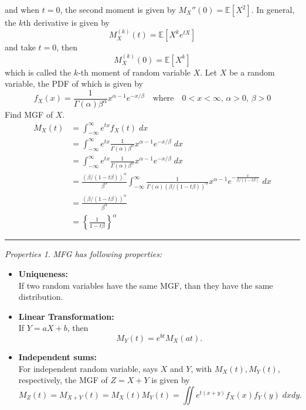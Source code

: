 \documentclass[twoside]{article}
\makeatletter
\theoremstyle{definition}
\theoremstyle{remark}
\newtheorem{properties}[theorem]{Properties}
\theoremstyle{remark}
\newenvironment{example}
 {\patchcmd{\@thm}{\trivlist}{\list{}{\leftmargin=3em \rightmargin=3em}}{}{}%
  \vspace*{10\p@}
  \innerexample\pushQED{\hfill\ensuremath{\Diamond}}}
 {\popQED\endinnerexample}
\newenvironment{sol}{{\bf Solution:}}{\hfill\rule{2mm}{2mm}}
\makeatother
\begin{document}
and when $t=0$, the second moment is given by $M_X''(0) = \mathbb{E}[X^2]$. In
general, the $k$th derivative is given by
\begin{equation}
  M_X^{(k)}(t) = \mathbb{E}[X^k{e^{tX}}]
\end{equation}
and take $t=0$, then
\begin{equation}
  M_X^{(k)}(0) = \mathbb{E}[X^k]
\end{equation}
which is called the $k$-th moment of random variable $X$.
\begin{example}
  Let $X$ be a random variable, the PDF of which is given by
  \begin{equation*}
    f_X(x) = \frac{1}{\Gamma(\alpha)\beta^{\alpha}} x^{\alpha-1}e^{-x/\beta}
    \quad \textrm{where} \quad 0 < x < \infty,\, \alpha>0,\, \beta>0
  \end{equation*}
  Find MGF of $X$. \\
  \begin{sol}
    \begin{equation*}
      \begin{split}
        M_X(t)
        &= \int_{-\infty}^{\infty} e^{tx} f_X(t) \;dx \\
        &= \int_{-\infty}^{\infty} e^{tx} \frac{1}{\Gamma(\alpha)\beta^{\alpha}} x^{\alpha-1}e^{-x/\beta} \;dx \\
        &= \int_{-\infty}^{\infty} e^{tx} \frac{1}{\Gamma(\alpha)\beta^{\alpha}} x^{\alpha-1}e^{-x/\beta} \;dx \\
        &= \frac{{(\beta/(1-t\beta))}^\alpha}{\beta^{\alpha}} \int_{-\infty}^{\infty} \frac{1}{\Gamma(\alpha){(\beta/(1-t\beta))}^\alpha} x^{\alpha-1} e^{-\frac{x}{\beta/(1-t\beta)}}  \;dx \\
        &= \frac{{(\beta/(1-t\beta))}^\alpha}{\beta^\alpha} \\
        &= {\left\{\frac{1}{1-t\beta}\right\}}^\alpha
      \end{split}
    \end{equation*}
  \end{sol}
\end{example}

\begin{properties}{\it MFG has following properties:}\\
  \begin{itemize}
    \item {\bf Uniqueness:}\\
          If two random variables have the same MGF, than they have the same distribution.
    \item {\bf Linear Transformation:}\\
          If $Y = aX + b$, then
          $$
          M_Y(t) = e^{bt}M_X(at).
          $$
    \item {\bf Independent sums:}\\
          For independent random variable, says $X$ and $Y$, with $M_X(t), M_Y(t)$,
          respectively, the MGF of $Z = X + Y$ is given by
          $$
          M_Z(t) = M_{X+Y}(t) = M_X(t)M_Y(t) = \iint e^{t(x+y)}f_X(x)f_Y(y) \;dxdy.
          $$
  \end{itemize}
\end{properties}


\printbibliography

\end{document}
